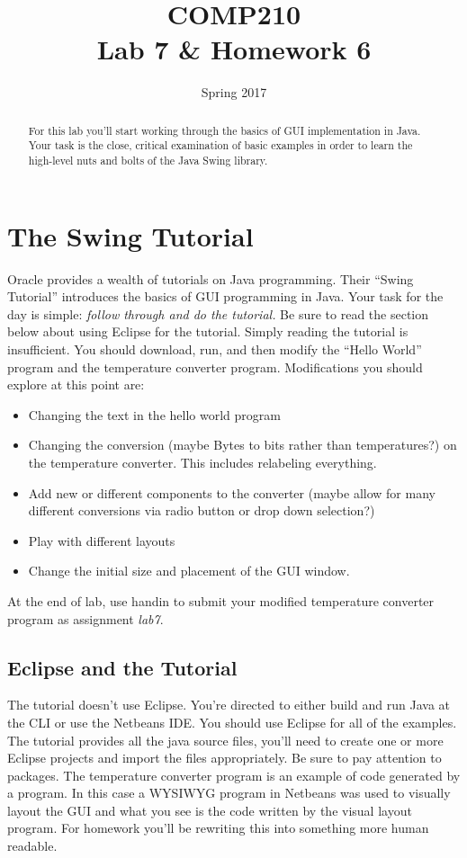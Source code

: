 \documentclass[]{tufte-handout}
\title{COMP210 \\ Lab 7 \& Homework 6}
\author{}
\date{Spring 2017}
\begin{document}
\maketitle

\begin{abstract}
For this lab you'll start working through the basics of GUI implementation in Java.  Your task is the close, critical examination of basic examples in order to learn the high-level nuts and bolts of the Java Swing library.
\end{abstract}

\section{The Swing Tutorial}

Oracle provides a wealth of tutorials on Java programming.  Their ``Swing Tutorial'' introduces the basics of GUI programming in Java.  Your task for the day is simple: \textit{follow through and do the tutorial.} Be sure to read the section below about using Eclipse for the tutorial. Simply reading the tutorial is insufficient.  You should download, run, and then modify the ``Hello World'' program and the temperature converter program. Modifications you should explore at this point are:
\begin{itemize}
\item Changing the text in the hello world program
\item Changing the conversion (maybe Bytes to bits rather than temperatures?) on the temperature converter. This includes relabeling everything.
\item Add new or different components to the converter (maybe allow for many different conversions via radio button or drop down selection?)
\item Play with different layouts
\item Change the initial size and placement of the GUI window.
\end{itemize}
At the end of lab, use handin to submit your modified temperature converter program as assignment \textit{lab7}.

\subsection*{Eclipse and the Tutorial}

The tutorial doesn't use Eclipse. You're directed to either build and run Java at the CLI or use the Netbeans IDE\@. You should use Eclipse for all of the examples.  The tutorial provides all the java source files, you'll need to create one or more Eclipse projects and import the files appropriately. Be sure to pay attention to packages. The temperature converter program is an example of code generated by a program. In this case a WYSIWYG program in Netbeans was used to visually layout the GUI and what you see is the code written by the visual layout program. For homework you'll be rewriting this into something more human readable.
\end{document}

